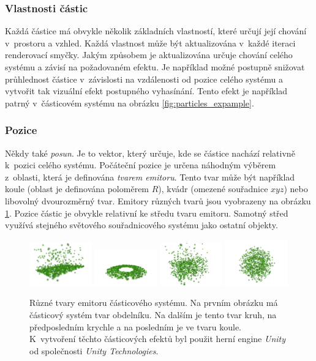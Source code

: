 \subsubsection{Vlastnosti částic}
Každá částice má obvykle několik základních vlastností, které určují její chování v~prostoru a vzhled. Každá vlastnost může být aktualizována v~každé iteraci renderovací smyčky. Jakým způsobem je aktualizována určuje chování celého systému a závisí na požadovaném efektu. Je například možné postupně snižovat průhlednost částice v~závislosti na vzdálenosti od pozice celého systému a vytvořit tak vizuální efekt postupného vyhasínání. Tento efekt je například patrný v~částicovém systému na obrázku \ref{fig:particles_expample}. 

\subsubsection*{Pozice} Někdy také \emph{posun}. Je to vektor, který určuje, kde se částice nachází relativně k~pozici celého systému. Počáteční pozice je určena náhodným výběrem z~oblasti, která je definována \emph{tvarem emitoru}. Tento tvar může být například koule (oblast je definována poloměrem \(R\)), kvádr (omezené souřadnice \(x y z\)) nebo libovolný dvourozměrný tvar. Emitory různých tvarů jsou vyobrazeny na obrázku \ref{fig:particles_position_expample}. Pozice částic je obvykle relativní ke středu tvaru emitoru. Samotný střed využívá stejného světového souřadnicového systému jako ostatní objekty.
\begin{figure}[H]
	\centering
	\includegraphics[width=0.24\textwidth]{obrazky-figures/rectangle_particles.png}
	\includegraphics[width=0.24\textwidth]{obrazky-figures/circle_particles.png}
	\includegraphics[width=0.24\textwidth]{obrazky-figures/square_particles.png}
	\includegraphics[width=0.24\textwidth]{obrazky-figures/sfere_particles.png}
	\caption{Různé tvary emitoru částicového systému. Na prvním obrázku má částicový systém tvar obdelníku. Na dalším je tento tvar kruh, na předposledním krychle a na posledním je ve tvaru koule. K~vytvoření těchto částicových efektů byl použit herní engine \emph{Unity} od společnosti \emph{ Unity Technologies}. }
	\label{fig:particles_position_expample}
\end{figure}
